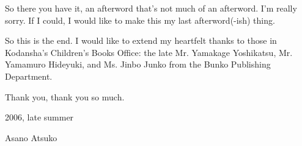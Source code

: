 So there you have it, an afterword that's not much of an afterword. I'm
really sorry. If I could, I would like to make this my last
afterword(-ish) thing.

So this is the end. I would like to extend my heartfelt thanks to those
in Kodansha's Children's Books Office: the late Mr. Yamakage Yoshikatsu,
Mr. Yamamuro Hideyuki, and Ms. Jinbo Junko from the Bunko Publishing
Department.

Thank you, thank you so much.

2006, late summer

Asano Atsuko

\hypertarget{index_split_132.htmlux5cux23calibre_pb_137}{%
\subsection{\texorpdfstring{\\
}{ }}\label{index_split_132.htmlux5cux23calibre_pb_137}}
